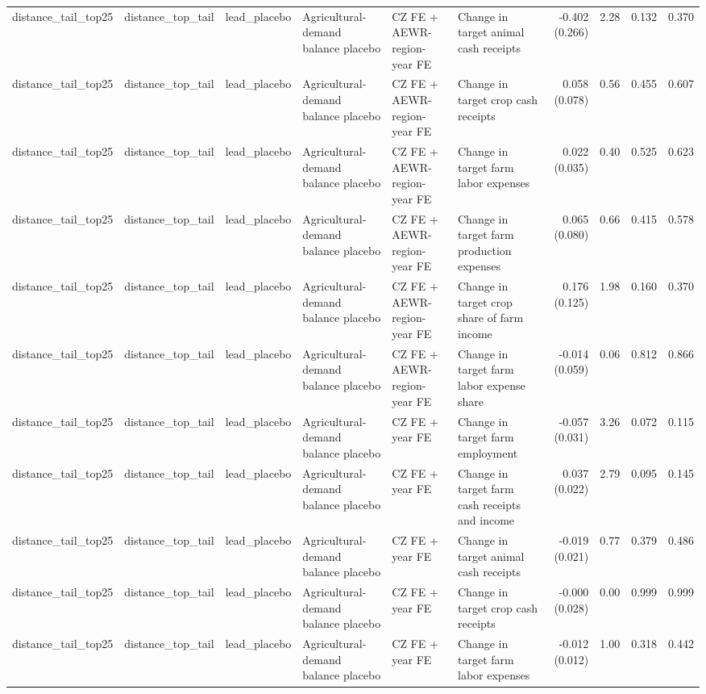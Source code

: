 \begin{tabular}{llllllrrrr}
distance_tail_top25 & distance_top_tail & lead_placebo & Agricultural-demand balance placebo & CZ FE + AEWR-region-year FE & Change in target animal cash receipts & -0.402 (0.266) & 2.28 & 0.132 & 0.370 \\
distance_tail_top25 & distance_top_tail & lead_placebo & Agricultural-demand balance placebo & CZ FE + AEWR-region-year FE & Change in target crop cash receipts & 0.058 (0.078) & 0.56 & 0.455 & 0.607 \\
distance_tail_top25 & distance_top_tail & lead_placebo & Agricultural-demand balance placebo & CZ FE + AEWR-region-year FE & Change in target farm labor expenses & 0.022 (0.035) & 0.40 & 0.525 & 0.623 \\
distance_tail_top25 & distance_top_tail & lead_placebo & Agricultural-demand balance placebo & CZ FE + AEWR-region-year FE & Change in target farm production expenses & 0.065 (0.080) & 0.66 & 0.415 & 0.578 \\
distance_tail_top25 & distance_top_tail & lead_placebo & Agricultural-demand balance placebo & CZ FE + AEWR-region-year FE & Change in target crop share of farm income & 0.176 (0.125) & 1.98 & 0.160 & 0.370 \\
distance_tail_top25 & distance_top_tail & lead_placebo & Agricultural-demand balance placebo & CZ FE + AEWR-region-year FE & Change in target farm labor expense share & -0.014 (0.059) & 0.06 & 0.812 & 0.866 \\
distance_tail_top25 & distance_top_tail & lead_placebo & Agricultural-demand balance placebo & CZ FE + year FE & Change in target farm employment & -0.057 (0.031) & 3.26 & 0.072 & 0.115 \\
distance_tail_top25 & distance_top_tail & lead_placebo & Agricultural-demand balance placebo & CZ FE + year FE & Change in target farm cash receipts and income & 0.037 (0.022) & 2.79 & 0.095 & 0.145 \\
distance_tail_top25 & distance_top_tail & lead_placebo & Agricultural-demand balance placebo & CZ FE + year FE & Change in target animal cash receipts & -0.019 (0.021) & 0.77 & 0.379 & 0.486 \\
distance_tail_top25 & distance_top_tail & lead_placebo & Agricultural-demand balance placebo & CZ FE + year FE & Change in target crop cash receipts & -0.000 (0.028) & 0.00 & 0.999 & 0.999 \\
distance_tail_top25 & distance_top_tail & lead_placebo & Agricultural-demand balance placebo & CZ FE + year FE & Change in target farm labor expenses & -0.012 (0.012) & 1.00 & 0.318 & 0.442 \\

\end{tabular}
